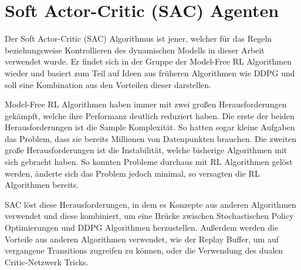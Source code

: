 \documentclass[]{iat}
\begin{document}
\section{Soft Actor-Critic (SAC) Agenten} \label{sec:howto_sac}
Der Soft Actor-Critic (SAC) Algorithmus ist jener, welcher für das Regeln beziehungsweise Kontrollieren des dynamischen Modells in dieser Arbeit verwendet wurde. Er findet sich in der Gruppe der Model-Free RL Algorithmen wieder und basiert zum Teil auf Ideen aus früheren Algorithmen wie DDPG und soll eine Kombination aus den Vorteilen dieser darstellen.

Model-Free RL Algorithmen haben immer mit zwei großen Herausforderungen gekämpft, welche ihre Performanz deutlich reduziert haben. Die erste der beiden Herausforderungen ist die Sample Komplexität. So hatten sogar kleine Aufgaben das Problem, dass sie bereits Millionen von Datenpunkten brauchen. Die zweiten große Herausforderungen ist die Instabilität, welche bisherige Algorithmen mit sich gebracht haben. So konnten Probleme durchaus mit RL Algorithmen gelöst werden, änderte sich das Problem jedoch minimal, so versagten die RL Algorithmen bereits. \cite[]{sacv2}

SAC löst diese Herausforderungen, in dem es Konzepte aus anderen Algorithmen verwendet und diese kombiniert, um eine Brücke zwischen Stochastischen Policy Optimierungen und DDPG Algorithmen herzustellen. Außerdem werden die Vorteile aus anderen Algorithmen verwendet, wie der Replay Buffer, um auf vergangene Transitions zugreifen zu können, oder die Verwendung des dualen Critic-Netzwerk Tricks. \cite[]{brockman2016openai}
\end{document}
